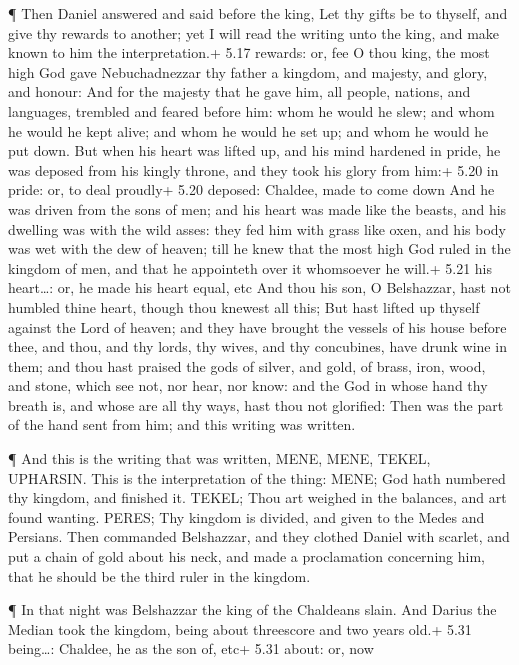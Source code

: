  ¶ Then Daniel answered and said before the king, Let thy
gifts be to thyself, and give thy rewards to another; yet I will read
the writing unto the king, and make known to him the interpretation.+
5.17 rewards: or, fee  O thou king, the most high God gave
Nebuchadnezzar thy father a kingdom, and majesty, and glory, and honour:
 And for the majesty that he gave him, all people, nations,
and languages, trembled and feared before him: whom he would he slew;
and whom he would he kept alive; and whom he would he set up; and whom
he would he put down.  But when his heart was lifted up,
and his mind hardened in pride, he was deposed from his kingly throne,
and they took his glory from him:+ 5.20 in pride: or, to deal proudly+
5.20 deposed: Chaldee, made to come down  And he was driven
from the sons of men; and his heart was made like the beasts, and his
dwelling was with the wild asses: they fed him with grass like oxen, and
his body was wet with the dew of heaven; till he knew that the most high
God ruled in the kingdom of men, and that he appointeth over it
whomsoever he will.+ 5.21 his heart\ldots: or, he made his heart equal,
etc  And thou his son, O Belshazzar, hast not humbled thine
heart, though thou knewest all this;  But hast lifted up
thyself against the Lord of heaven; and they have brought the vessels of
his house before thee, and thou, and thy lords, thy wives, and thy
concubines, have drunk wine in them; and thou hast praised the gods of
silver, and gold, of brass, iron, wood, and stone, which see not, nor
hear, nor know: and the God in whose hand thy breath is, and whose are
all thy ways, hast thou not glorified:  Then was the part
of the hand sent from him; and this writing was written.

 ¶ And this is the writing that was written, MENE, MENE,
TEKEL, UPHARSIN.  This is the interpretation of the thing:
MENE; God hath numbered thy kingdom, and finished it. 
TEKEL; Thou art weighed in the balances, and art found wanting.
 PERES; Thy kingdom is divided, and given to the Medes and
Persians.  Then commanded Belshazzar, and they clothed
Daniel with scarlet, and put a chain of gold about his neck, and made a
proclamation concerning him, that he should be the third ruler in the
kingdom.

 ¶ In that night was Belshazzar the king of the Chaldeans
slain.  And Darius the Median took the kingdom, being about
threescore and two years old.+ 5.31 being\ldots: Chaldee, he as the son
of, etc+ 5.31 about: or, now

